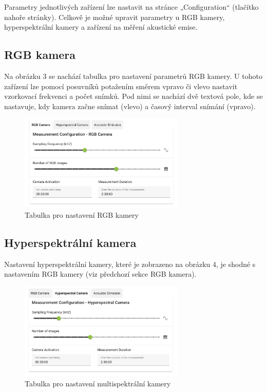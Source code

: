 \documentclass[12pt]{article}
\begin{document}
\begin{teamwork}
        Parametry jednotlivých zařízení lze nastavit na stránce „Configuration“ (tlačítko nahoře stránky).
        Celkově je možné upravit parametry u RGB kamery, hyperspektrální kamery a zařízení na měření akustické emise.

        \subsection{RGB kamera}\label{subsec:rgb-kamera}

        Na obrázku 3 se nachází tabulka pro nastavení parametrů RGB kamery.
        U tohoto zařízení lze pomocí posuvníků
        potažením směrem vpravo či vlevo nastavit vzorkovací frekvenci a počet snímků.
        Pod nimi se nachází dvě textová
        pole, kde se nastavuje, kdy kamera začne snímat (vlevo) a časový interval snímání (vpravo).

        \begin{figure}[hbt!]
            \centering
            \includegraphics[width=0.7\textwidth]{../../img/rgb_cam_settings}
            \caption{Tabulka pro nastavení RGB kamery}
            \label{fig:rgb_cam_settings}
        \end{figure}

        \subsection{Hyperspektrální kamera}\label{subsec:hyperspektralni-kamera}

        Nastavení hyperspektrální kamery, které je zobrazeno na obrázku 4,
        je shodné s nastavením RGB kamery (viz předchozí sekce RGB kamera).

        \begin{figure}[hbt!]
            \centering
            \includegraphics[width=0.7\textwidth]{../../img/multi_cam_settings}
            \caption{Tabulka pro nastavení multispektrální kamery}
            \label{fig:multi_cam_settings}
        \end{figure}


\end{teamwork}
\end{document}
